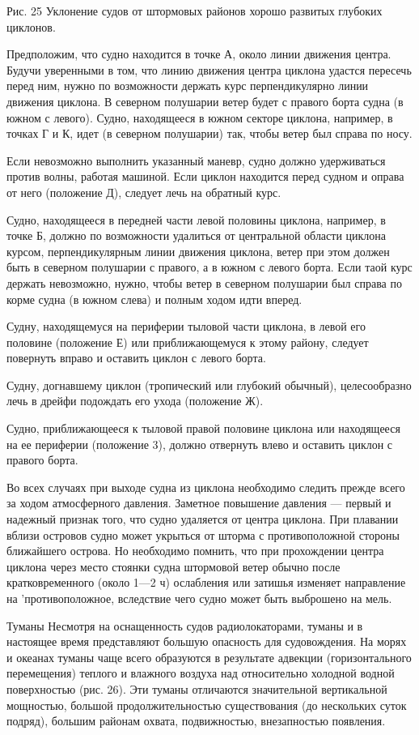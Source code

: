 Рис. 25 Уклонение судов от штормовых районов хорошо развитых глубоких циклонов.

Предположим, что судно находится в точке А, около линии движения центра. Будучи уверенными в том, что линию движения центра циклона удастся пересечь перед ним, нужно по возможности держать курс перпендикулярно линии движения циклона. В северном полушарии ветер будет с правого борта судна (в южном с левого). Судно, находящееся в южном секторе циклона, например, в точках Г и К, идет (в северном полушарии) так, чтобы ветер был справа по носу.

Если невозможно выполнить указанный маневр, судно должно удерживаться против волны, работая машиной. Если циклон находится перед судном и оправа от него (положение Д), следует лечь на обратный курс.

Судно, находящееся в передней части левой половины циклона, например, в точке Б, должно по возможности удалиться от центральной области циклона курсом, перпендикулярным линии движения циклона, ветер при этом должен быть в северном полушарии с правого, а в южном с левого борта. Если таой курс держать невозможно, нужно, чтобы ветер в северном полушарии был справа по корме судна (в южном слева) и полным ходом идти вперед.

Судну, находящемуся на периферии тыловой части циклона, в левой его половине (положение Е) или приближающемуся к этому району, следует повернуть вправо и оставить циклон с левого борта.

Судну, догнавшему циклон (тропический или глубокий обычный), целесообразно лечь в дрейфи подождать его ухода (положение Ж).

Судно, приближающееся к тыловой правой половине циклона или находящееся на ее периферии (положение 3), должно отвернуть влево и оставить циклон с правого борта.

Во всех случаях при выходе судна из циклона необходимо следить прежде всего за ходом атмосферного давления. Заметное повышение давления — первый и надежный признак того, что судно удаляется от центра циклона. При плавании вблизи островов судно может укрыться от шторма с противоположной стороны ближайшего острова. Но необходимо помнить, что при прохождении центра циклона через место стоянки судна штормовой ветер обычно после кратковременного (около 1—2 ч) ослабления или затишья изменяет направление на 'противоположное, вследствие чего судно может быть выброшено на мель.

Туманы
Несмотря на оснащенность судов радиолокаторами, туманы и в настоящее время представляют большую опасность для судовождения. На морях и океанах туманы чаще всего образуются в результате адвекции (горизонтального перемещения) теплого и влажного воздуха над относительно холодной водной поверхностью (рис. 26). Эти туманы отличаются значительной вертикальной мощностью, большой продолжительностью существования (до нескольких суток подряд), большим районам охвата, подвижностью, внезапностью появления.


